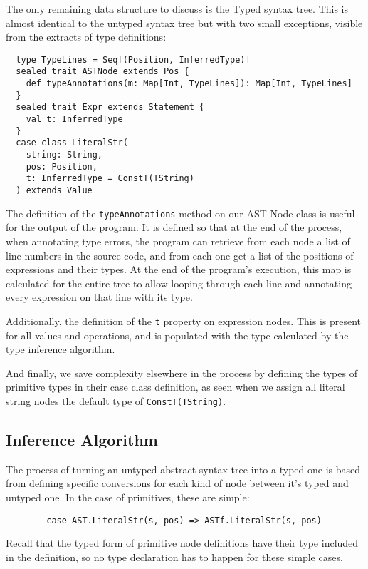 \documentclass[british, twoside]{bhamthesis}
\theoremstyle{definition}
\begin{document}
      The only remaining data structure to discuss is the Typed syntax tree. This is almost identical to the untyped syntax tree but with two small exceptions, visible from the extracts of type definitions:
      \begin{lstlisting}
  type TypeLines = Seq[(Position, InferredType)]
  sealed trait ASTNode extends Pos {
    def typeAnnotations(m: Map[Int, TypeLines]): Map[Int, TypeLines]
  }
  sealed trait Expr extends Statement {
    val t: InferredType
  }
  case class LiteralStr(
    string: String,
    pos: Position,
    t: InferredType = ConstT(TString)
  ) extends Value
      \end{lstlisting}

      The definition of the \texttt{typeAnnotations} method on our AST Node class is useful for the output of the program. It is defined so that at the end of the process, when annotating type errors, the program can retrieve from each node a list of line numbers in the source code, and from each one get a list of the positions of expressions and their types. At the end of the program's execution, this map is calculated for the entire tree to allow looping through each line and annotating every expression on that line with its type.

      Additionally, the definition of the \texttt{t} property on expression nodes. This is present for all values and operations, and is populated with the type calculated by the type inference algorithm.

      And finally, we save complexity elsewhere in the process by defining the types of primitive types in their case class definition, as seen when we assign all literal string nodes the default type of \texttt{ConstT(TString)}.

      \subsection{Inference Algorithm}

      The process of turning an untyped abstract syntax tree into a typed one is based from defining specific conversions for each kind of node between it's typed and untyped one. In the case of primitives, these are simple:

      \begin{lstlisting}
        case AST.LiteralStr(s, pos) => ASTf.LiteralStr(s, pos)
      \end{lstlisting}

      Recall that the typed form of primitive node definitions have their type included in the definition, so no type declaration has to happen for these simple cases.
\end{document}
